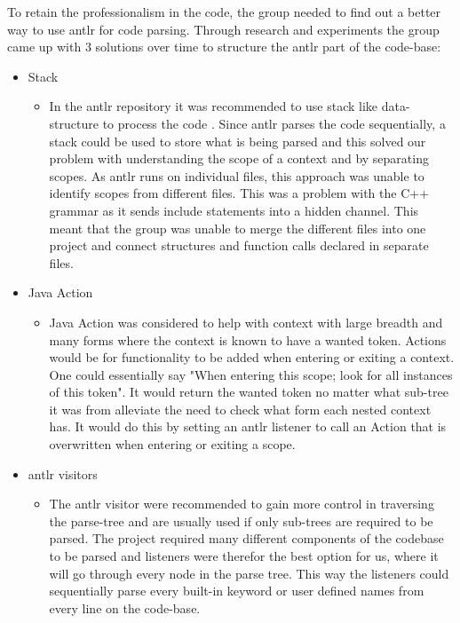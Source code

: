 To retain the professionalism in the code, the group needed to find out a better way to use \gls{antlr} for code parsing. Through research and experiments the group came up with 3 solutions over time to structure the \gls{antlr} part of the code-base:
\begin{itemize}
    \item Stack
    \begin{itemize}
        \item In the \gls{antlr} repository it was recommended to use stack like data-structure to process the code \cite{github:stackAntlr}. Since \gls{antlr} parses the code sequentially, a stack could be used to store what is being parsed and this solved our problem with understanding the scope of a context and by separating scopes. As \gls{antlr} runs on individual files, this approach was unable to identify scopes from different files. This was a problem with the C++ grammar as it sends include statements into a hidden channel. This meant that the group was unable to merge the different files into one project and connect structures and function calls declared in separate files.
    \end{itemize}

    \item Java Action
    \begin{itemize}
        \item Java Action was considered to help with context with large breadth and many forms where the context is known to have a wanted token. Actions would be for functionality to be added when entering or exiting a context. One could essentially say "When entering this scope; look for all instances of this token". It would return the wanted token no matter what sub-tree it was from alleviate the need to check what form each nested context has. It would do this by setting an \gls{antlr} listener to call an Action that is overwritten when entering or exiting a scope.
    \end{itemize}

    \item \gls{antlr} visitors 
    \begin{itemize}
        \item The \gls{antlr} visitor were recommended to gain more control in traversing the parse-tree and are usually used if only sub-trees are required to be parsed. The project required many different components of the codebase to be parsed and listeners were therefor the best option for us, where it will go through every node in the parse tree. This way the listeners could sequentially parse every built-in keyword or user defined names from every line on the code-base.
    \end{itemize}
\end{itemize}


